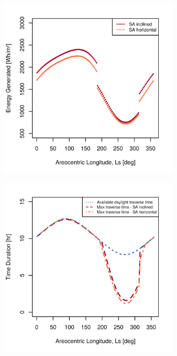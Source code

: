 \documentclass[twocolumn,letterpaper]{IEEEAerospaceCLS}  %
\newlength{\subfigureWidth}
\newlength{\graphicsHeight}
\begin{document}
\begin{figure}[h]
\captionsetup[subfigure]{justification=centering}
  \centering
  \setlength{\subfigureWidth}{0.24\textwidth}
  \setlength{\graphicsHeight}{40mm}
  \begin{subfigure}[t]{\subfigureWidth}
    \centering
    \includegraphics[height=\graphicsHeight]{figures/plots/ismeniuscavus-daily-generated-energy-for-solar-cell-coverage-area-41m2.png}
    \label{fig:plot:sub:ismenius-cavus-generated-energy}
  \end{subfigure}\hfill
  \begin{subfigure}[t]{\subfigureWidth}
    \centering
    \includegraphics[height=\graphicsHeight]{figures/plots/ismeniuscavus-75w-max-traverse-durations-for-solar-cell-coverage-area-41m2.png}

\end{subfigure}
\end{figure}
\end{document}
